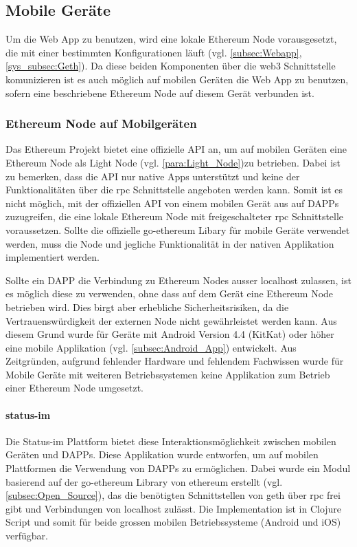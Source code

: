 \subsection{Mobile Geräte}
Um die Web App zu benutzen, wird eine lokale Ethereum Node vorausgesetzt, die mit einer bestimmten Konfigurationen läuft (vgl. \ref{subsec:Webapp}, \ref{sys_subsec:Geth}). Da diese beiden Komponenten über die web3 Schnittstelle komunizieren ist es auch möglich auf mobilen Geräten die Web App zu benutzen, sofern eine beschriebene Ethereum Node auf diesem Gerät verbunden ist.

\subsubsection{Ethereum Node auf Mobilgeräten}
Das Ethereum Projekt bietet eine offizielle API an, um auf mobilen Geräten eine Ethereum Node als Light Node (vgl. \ref{para:Light_Node})zu betrieben. Dabei ist zu bemerken, dass die API nur native Apps unterstützt und keine der Funktionalitäten über die rpc Schnittstelle angeboten werden kann. Somit ist es nicht möglich, mit der offiziellen API von einem mobilen Gerät aus auf \acrshort{DAPPs} zuzugreifen, die eine lokale Ethereum Node mit freigeschalteter rpc Schnittstelle voraussetzen. Sollte die offizielle go-ethereum Libary für mobile Geräte verwendet werden, muss die Node und jegliche Funktionalität in der nativen Applikation implementiert werden.\cite[wiki/Mobile: Introduction]{go-ethereum}

Sollte ein \acrshort{DAPP} die Verbindung zu Ethereum Nodes ausser localhost zulassen, ist es möglich diese zu verwenden, ohne dass auf dem Gerät eine Ethereum Node betrieben wird. Dies birgt aber erhebliche Sicherheitsrisiken, da die Vertrauenswürdigkeit der externen Node nicht gewährleistet werden kann. Aus diesem Grund wurde für Geräte mit Android Version 4.4 (KitKat) oder höher eine mobile Applikation (vgl. \ref{subsec:Android_App}) entwickelt. Aus Zeitgründen, aufgrund fehlender Hardware und fehlendem Fachwissen wurde für Mobile Geräte mit weiteren Betriebssystemen keine Applikation zum Betrieb einer Ethereum Node umgesetzt.
\paragraph{status-im}
Die Status-im Plattform bietet diese Interaktionsmöglichkeit zwischen mobilen Geräten und \acrshort{DAPPs}. Diese Applikation wurde entworfen, um auf mobilen Plattformen die Verwendung von \acrshort{DAPPs} zu ermöglichen. Dabei wurde ein Modul basierend auf der go-ethereum Library von ethereum erstellt (vgl. \ref{subsec:Open_Source}), das die benötigten Schnittstellen von geth über rpc frei gibt und Verbindungen von localhost zulässt. Die Implementation ist in Clojure Script und somit für beide grossen mobilen Betriebssysteme (Android und iOS) verfügbar.\cite{status-im_whitepaper, github.com/status-im/status-go}

